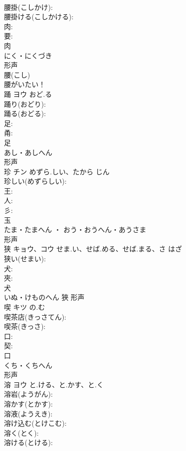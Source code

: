 \documentclass[8pt]{extreport}
\begin{document}
\begin{CJK}{UTF8}{min}
\\	腰掛(こしかけ): 
\\	腰掛ける(こしかける): 
\\	肉: 
\\	要: 
\\	肉	
\\	にく・にくづき	
\\	形声 
\\	腰(こし) 
\\	腰がいたい！
\\	踊	ヨウ	おど.る		
\\	踊り(おどり): 
\\	踊る(おどる): 
\\	足: 
\\	甬: 
\\	足	
\\	あし・あしへん	
\\	形声 
\\	珍	チン	めずら.しい、たから	じん	
\\	珍しい(めずらしい): 
\\	王: 
\\	人: 
\\	彡: 
\\	玉	
\\	たま・たまへん ・ おう・おうへん・あうさま	
\\	形声 
\\	狭	キョウ、コウ	せま.い、せば.める、せば.まる、さ	はざ	
\\	狭い(せまい): 
\\	犬: 
\\	夾: 
\\	犬	
\\	いぬ・けものへん	狹	形声 
\\	喫	キツ	の.む		
\\	喫茶店(きっさてん): 
\\	喫茶(きっさ): 
\\	口: 
\\	契: 
\\	口	
\\	くち・くちへん	
\\	形声 
\\	溶	ヨウ	と.ける、と.かす、と.く		
\\	溶岩(ようがん): 
\\	溶かす(とかす): 
\\	溶液(ようえき): 
\\	溶け込む(とけこむ): 
\\	溶く(とく): 
\\	溶ける(とける): 

\end{CJK}
\end{document}
